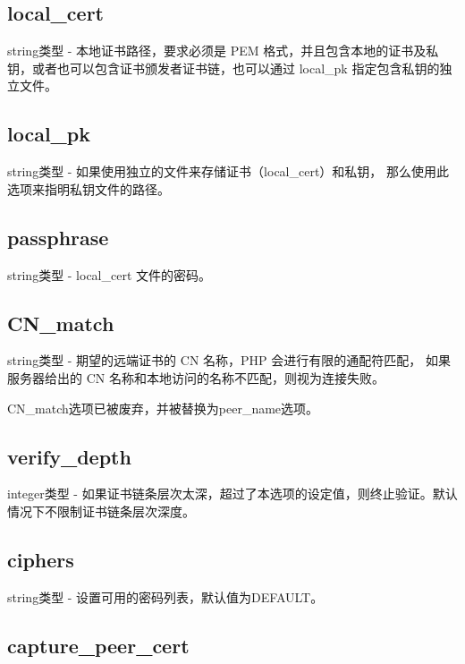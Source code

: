 \subsection{local\_cert}

string类型 - 本地证书路径，要求必须是 PEM 格式，并且包含本地的证书及私钥，或者也可以包含证书颁发者证书链，也可以通过 local\_pk 指定包含私钥的独立文件。




\subsection{local\_pk}

string类型 - 如果使用独立的文件来存储证书（local\_cert）和私钥， 那么使用此选项来指明私钥文件的路径。


\subsection{passphrase}

string类型 - local\_cert 文件的密码。


\subsection{CN\_match}

string类型 - 期望的远端证书的 CN 名称，PHP 会进行有限的通配符匹配， 如果服务器给出的 CN 名称和本地访问的名称不匹配，则视为连接失败。

CN\_match选项已被废弃，并被替换为peer\_name选项。


\subsection{verify\_depth}

integer类型 - 如果证书链条层次太深，超过了本选项的设定值，则终止验证。默认情况下不限制证书链条层次深度。






\subsection{ciphers}

string类型 - 设置可用的密码列表，默认值为DEFAULT。


\subsection{capture\_peer\_cert}

